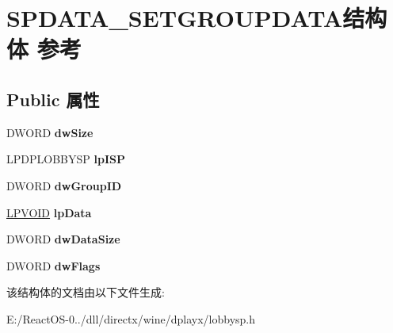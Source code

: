 \hypertarget{struct_s_p_d_a_t_a___s_e_t_g_r_o_u_p_d_a_t_a}{}\section{S\+P\+D\+A\+T\+A\+\_\+\+S\+E\+T\+G\+R\+O\+U\+P\+D\+A\+T\+A结构体 参考}
\label{struct_s_p_d_a_t_a___s_e_t_g_r_o_u_p_d_a_t_a}
\subsection*{Public 属性}
\begin{DoxyCompactItemize}
\item 
\mbox{\label{struct_s_p_d_a_t_a___s_e_t_g_r_o_u_p_d_a_t_a_a5c9b4a64007947a665c4cc6816571035}} 
D\+W\+O\+RD {\bfseries dw\+Size}
\item 
\mbox{\label{struct_s_p_d_a_t_a___s_e_t_g_r_o_u_p_d_a_t_a_a35ac9ae3f5f4ef7b5fab97fbd6975fd7}} 
L\+P\+D\+P\+L\+O\+B\+B\+Y\+SP {\bfseries lp\+I\+SP}
\item 
\mbox{\label{struct_s_p_d_a_t_a___s_e_t_g_r_o_u_p_d_a_t_a_a88402f9a340a1d45b523490e779fbb93}} 
D\+W\+O\+RD {\bfseries dw\+Group\+ID}
\item 
\mbox{\label{struct_s_p_d_a_t_a___s_e_t_g_r_o_u_p_d_a_t_a_a82ae382b8489a682aa029d7cb0f98931}} 
\hyperlink{interfacevoid}{L\+P\+V\+O\+ID} {\bfseries lp\+Data}
\item 
\mbox{\label{struct_s_p_d_a_t_a___s_e_t_g_r_o_u_p_d_a_t_a_a602ba3e3b4856fde3c7697ea9e9618d4}} 
D\+W\+O\+RD {\bfseries dw\+Data\+Size}
\item 
\mbox{\label{struct_s_p_d_a_t_a___s_e_t_g_r_o_u_p_d_a_t_a_a409f41957411b1f1ef61979cc8a1947d}} 
D\+W\+O\+RD {\bfseries dw\+Flags}
\end{DoxyCompactItemize}


该结构体的文档由以下文件生成\+:\begin{DoxyCompactItemize}
\item 
E\+:/\+React\+O\+S-\/0../dll/directx/wine/dplayx/lobbysp.\+h\end{DoxyCompactItemize}
